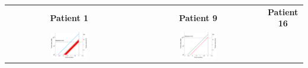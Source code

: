 
\usepackage[percent]{overpic}


\selectfont
\def\raiseS[#1]{\raisebox{2\height}{#1}}
\def\coll{0.3\textwidth}
\def\up{3.5}
\graphicspath{
{../../code/}
}	
\begin{tabular}{ccc}
\textbf{Patient 1}
&
\textbf{Patient 9}
&
\textbf{Patient 16}
\\[1ex]
\includegraphics[width=\coll]{simulations/patient_1/growth_mets.pdf}
&
\includegraphics[width=\coll]{simulations/patient_9/growth_mets.pdf}

\end{tabular}
